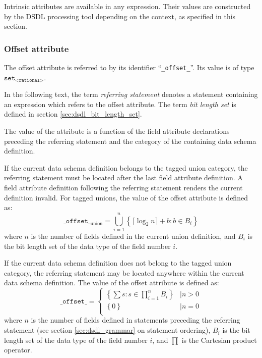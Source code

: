 Intrinsic attributes are available in any expression.
Their values are constructed by the DSDL processing tool depending on the context,
as specified in this section.

\subsubsection{Offset attribute}

The offset attribute is referred to by its identifier ``\verb|_offset_|''.
Its value is of type $\texttt{set}_\texttt{<rational>}$.

In the following text, the term \emph{referring statement} denotes a statement
containing an expression which refers to the offset attribute.
The term \emph{bit length set} is defined in section \ref{sec:dsdl_bit_length_set}.

The value of the attribute is a function of the field attribute declarations preceding the referring statement
and the category of the containing data schema definition.

If the current data schema definition belongs to the tagged union category,
the referring statement must be located after the last field attribute definition.
A field attribute definition following the referring statement renders the current definition invalid.
For tagged unions, the value of the offset attribute is defined as:
$$
    \texttt{\_offset\_}_\text{union} =
    \bigcup\limits_{i=1}^{n}
    \left\{ \lceil{}\log_2 n\rceil{} + b : b \in B_i \right\}
$$
where $n$ is the number of fields defined in the current union definition,
and $B_i$ is the bit length set of the data type of the field number $i$.

If the current data schema definition does not belong to the tagged union category,
the referring statement may be located anywhere within the current data schema definition.
The value of the offset attribute is defined as:
$$
    \texttt{\_offset\_} =
    \begin{cases}
        \left\{ \sum s : s \in \prod\limits_{i=1}^{n} B_i \right\} &\mid n > 0 \\
        \left\{0\right\}                                           &\mid n = 0 \\
    \end{cases}
$$
where $n$ is the number of fields defined in statements preceding the referring statement
(see section \ref{sec:dsdl_grammar} on statement ordering),
$B_i$ is the bit length set of the data type of the field number $i$,
and $\prod$ is the Cartesian product operator.


